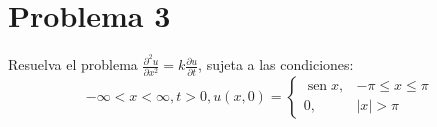 \section{Problema 3} Resuelva el problema $\frac{\partial^{2} u}{\partial x^{2}}=k \frac{\partial u}{\partial t}$, sujeta a las condiciones:
$$
-\infty<x<\infty, t>0, u(x, 0)=\left\{\begin{array}{cc}
\operatorname{sen} x, & -\pi \leq x \leq \pi \\
0, & |x|>\pi
\end{array}\right.
$$